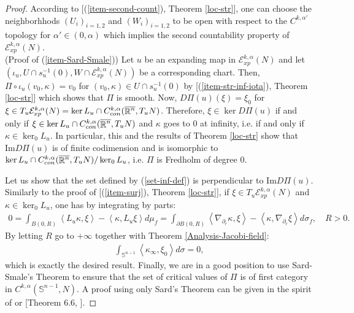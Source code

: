 \documentclass[a4paper,11pt,reqno]{amsart}
\def\R{\mathop{\rm \mathbb{R}}\nolimits}
\newcommand{\Ent}{\mathcal{E}}
\newcommand{\Ima}{\text{Im}}
\begin{document}
\begin{proof}
According to [(\ref{item-second-count}), Theorem \ref{loc-str}], one can choose the neighborhhods $(U_i)_{i=1,2}$ and $(W_i)_{i=1,2}$ to be open with respect to the $C^{k,\alpha'}$ topology for $\alpha'\in(0,\alpha)$ which implies the second countability property of $\Ent_{xp}^{k,\alpha}(N)$.\\

(Proof of (\ref{item-Sard-Smale}))
Let $u$ be an expanding map in $\Ent_{xp}^{k,\alpha}(N)$ and let $(\iota_{u},U\cap s_{u}^{-1}(0),W\cap \Ent_{xp}^{k,\alpha}(N))$ be a corresponding chart. Then, $\Pi\circ \iota_u(v_0,\kappa)=v_0$ for $(v_0,\kappa)\in U\cap s_{u}^{-1}(0)$ by [(\ref{item-str-inf-iota}), Theorem \ref{loc-str}] which shows that $\Pi$ is smooth. Now, $D\Pi(u)(\xi)=\xi_0$ for $\xi\in T_u\Ent_{xp}^{k,\alpha}(N)=\ker L_u\cap C_{con}^{k,\alpha}(\overline{\R^n},T_uN)$. Therefore, $\xi\in \ker D\Pi(u)$ if and only if $\xi\in \ker L_u\cap C_{con}^{k,\alpha}(\overline{\R^n},T_uN)$ and $\kappa$ goes to $0$ at infinity, i.e. if and only if $\kappa\in \ker_0L_u$. In particular, this and the results of Theorem \ref{loc-str} show that $\Ima D\Pi(u)$ is of finite codimension and is isomorphic to $\ker L_u\cap C_{con}^{k,\alpha}(\overline{\R^n},T_uN)/\ker_0L_u$, i.e. $\Pi$ is Fredholm of degree $0$.

Let us show that the set defined by (\ref{set-inf-def}) is perpendicular to $\Ima D\Pi(u)$. Similarly to the proof of [(\ref{item-surj}), Theorem \ref{loc-str}], if $\xi\in T_u\Ent_{xp}^{k,\alpha}(N)$ and $\kappa\in\ker_0L_u$, one has by integrating by parts:
\begin{eqnarray*}
0=\int_{B(0,R)}\left<L_u\kappa,\xi\right>-\left<\kappa,L_u\xi\right>d\mu_f=\int_{\partial B(0,R)}\left<\nabla_{\partial_r}\kappa,\xi\right>-\left<\kappa,\nabla_{\partial_r}\xi\right>d\sigma_f,\quad R>0.
\end{eqnarray*}
By letting $R$ go to $+\infty$ together with Theorem \ref{Analysis-Jacobi-field}:
\begin{eqnarray*}
\int_{\mathbb{S}^{n-1}}\left<\kappa_{\infty},\xi_0\right>d\sigma=0,
\end{eqnarray*}
which is exactly the desired result. 
Finally, we are in a good position to use Sard-Smale's Theorem \cite{Sard-Smale} to ensure that the set of critical values of $\Pi$ is of first category in $C^{k,\alpha}(\mathbb{S}^{n-1},N)$. A proof using only Sard's Theorem can be given in the spirit of \cite{White-var-met} or [Theorem $6.6$, \cite{Har-Mou}].
\end{proof}
 
\end{document}
